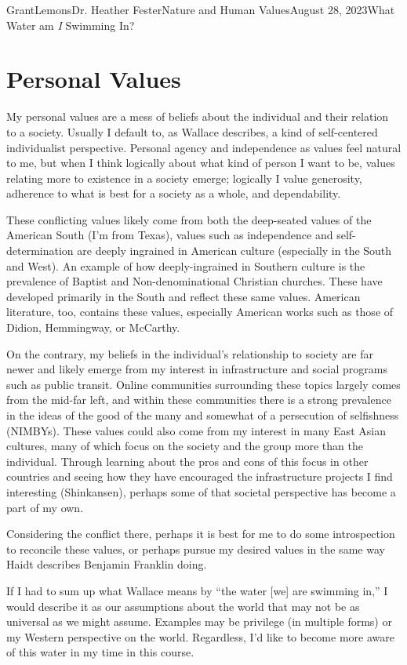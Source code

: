 \documentclass[12pt,letterpaper]{article}
\begin{document}
\begin{mla}{Grant}{Lemons}{Dr. Heather Fester}{Nature and Human Values}{August 28, 2023}{What Water am \textit{I} Swimming In?}
    \section{Personal Values}
        My personal values are a mess of beliefs about the individual and their relation to a society.
        Usually I default to, as Wallace describes, a kind of self-centered individualist perspective.
        Personal agency and independence as values feel natural to me, but when I think logically about what kind of person I want to be, values relating more to existence in a society emerge;
        logically I value generosity, adherence to what is best for a society as a whole, and dependability.

        These conflicting values likely come from both the deep-seated values of the American South (I'm from Texas), values such as independence and self-determination are deeply ingrained in American culture (especially in the South and West).
        An example of how deeply-ingrained in Southern culture is the prevalence of Baptist and Non-denominational Christian churches. These have developed primarily in the South and reflect these same values.
        American literature, too, contains these values, especially American works such as those of Didion, Hemmingway, or McCarthy.

        On the contrary, my beliefs in the individual's relationship to society are far newer and likely emerge from my interest in infrastructure and social programs such as public transit.
        Online communities surrounding these topics largely comes from the mid-far left, and within these communities there is a strong prevalence in the ideas of the good of the many and somewhat of a persecution of selfishness (NIMBYs).
        These values could also come from my interest in many East Asian cultures, many of which focus on the society and the group more than the individual.
        Through learning about the pros and cons of this focus in other countries and seeing how they have encouraged the infrastructure projects I find interesting (Shinkansen), perhaps some of that societal perspective has become a part of my own.
        
        Considering the conflict there, perhaps it is best for me to do some introspection to reconcile these values, or perhaps pursue my desired values in the same way Haidt describes Benjamin Franklin doing.

        If I had to sum up what Wallace means by \enquote{the water [we] are swimming in,} \autocite{water} I would describe it as our assumptions about the world that may not be as universal as we might assume.
        Examples may be privilege (in multiple forms) or my Western perspective on the world.
        Regardless, I'd like to become more aware of this water in my time in this course.


\end{mla}
\end{document}
